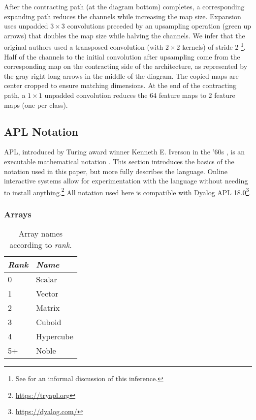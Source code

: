 \documentclass[10pt,twocolumn,english,format=sigplan,screen,balance]{acmart}
\providecommand{\tabularnewline}{\\}
\begin{document}
After the contracting path (at the diagram bottom) completes, a corresponding
expanding path reduces the channels while increasing the map size.
Expansion uses unpadded $3\times3$ convolutions preceded by an upsampling
operation (green up arrows) that doubles the map size while halving
the channels. We infer that the original authors used a transposed
convolution (with $2\times2$ kernels) of stride $2$ \citep{conv-arithmetic-guide}\footnote{See \citep{up-transposed} for an informal discussion of this inference.}.
Half of the channels to the initial convolution after upsampling come
from the corresponding map on the contracting side of the architecture,
as represented by the gray right long arrows in the middle of the
diagram. The copied maps are center cropped to ensure matching dimensions.
At the end of the contracting path, a $1\times1$ unpadded convolution
reduces the $64$ feature maps to $2$ feature maps (one per class).

\subsection{APL Notation}

APL, introduced by Turing award winner Kenneth E. Iverson in the '60s
\citep{apl}, is an executable mathematical notation \citep{apl-since-78}.
This section introduces the basics of the notation used in this paper,
but \citet{mdapl} more fully describes the language. Online interactive
systems allow for experimentation with the language without needing
to install anything.\footnote{\url{https://tryapl.org}} All notation
used here is compatible with Dyalog APL 18.0\footnote{\url{https://dyalog.com/}}.

\subsubsection{Arrays}

\begin{table}
\caption{Array names according to \emph{rank}.\label{tab:rank-names}}
\begin{tabular}{ll}
\emph{Rank} &
\emph{Name}\tabularnewline
\midrule 
0 &
Scalar\tabularnewline
1 &
Vector\tabularnewline
2 &
Matrix\tabularnewline
3 &
Cuboid\tabularnewline
4 &
Hypercube\tabularnewline
5+ &
Noble\tabularnewline
\bottomrule
\end{tabular}
\end{table}
\end{document}
